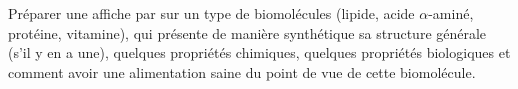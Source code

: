 \begin{programmeSeance}[nombre = 2, distance = 0 pt]
\end{programmeSeance}


\begin{tacheFinale}
  Préparer une affiche par  sur un type de biomolécules (lipide, acide $\alpha$-aminé, protéine, vitamine), qui présente de manière synthétique sa structure générale (s'il y en a une), quelques propriétés chimiques, quelques propriétés biologiques et comment avoir une alimentation saine du point de vue de cette biomolécule.
\end{tacheFinale}


